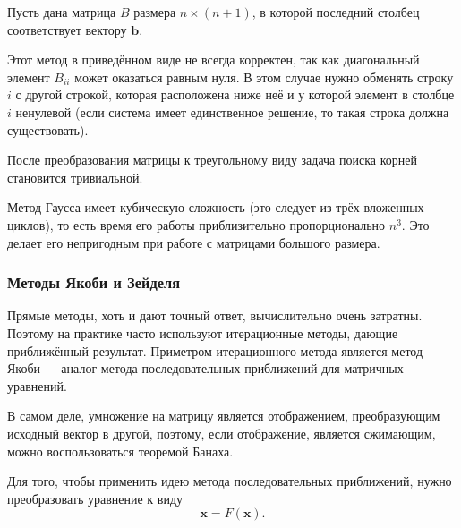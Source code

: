 Пусть дана матрица $B$ размера $n\times(n+1)$, в которой последний
столбец соответствует вектору $\mathbf{b}$.


Этот метод в приведённом виде не всегда корректен, так как диагональный
элемент $B_{ii}$ может оказаться равным нуля. В этом случае нужно
обменять строку $i$ с другой строкой, которая расположена ниже неё
и у которой элемент в столбце $i$ ненулевой (если система имеет единственное
решение, то такая строка должна существовать).

После преобразования матрицы к треугольному виду задача поиска корней
становится тривиальной.

Метод Гаусса имеет кубическую сложность (это следует из трёх вложенных
циклов), то есть время его работы приблизительно пропорционально $n^{3}$.
Это делает его непригодным при работе с матрицами большого размера.


\subsubsection{Методы Якоби и Зейделя}

Прямые методы, хоть и дают точный ответ, вычислительно очень затратны.
Поэтому на практике часто используют итерационные методы, дающие приближённый
результат. Приметром итерационного метода является метод Якоби — аналог
метода последовательных приближений для матричных уравнений.

В самом деле, умножение на матрицу является отображением, преобразующим
исходный вектор в другой, поэтому, если отображение, является сжимающим,
можно воспользоваться теоремой Банаха.

Для того, чтобы применить идею метода последовательных приближений,
нужно преобразовать уравнение к виду
\[
\mathbf{x}=F(\mathbf{x}).
\]


